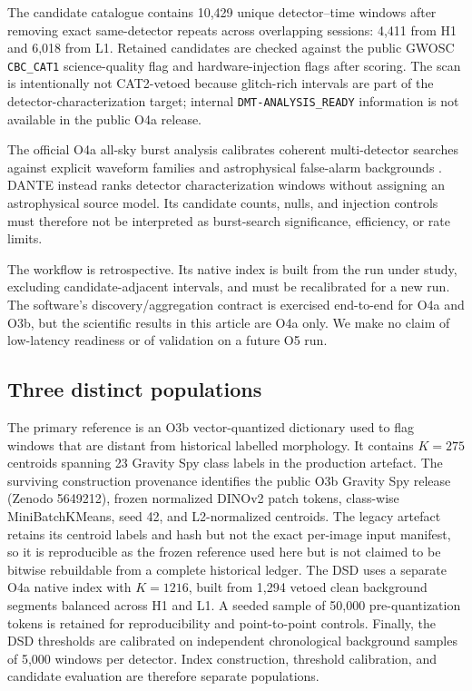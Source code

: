 \documentclass[12pt]{article}
\begin{document}
The candidate catalogue contains 10,429 unique detector--time windows after
removing exact same-detector repeats across overlapping sessions: 4,411 from
H1 and 6,018 from L1.  Retained candidates are checked against the public
GWOSC \texttt{CBC\_CAT1} science-quality flag and hardware-injection flags
after scoring.  The scan is intentionally not CAT2-vetoed because glitch-rich
intervals are part of the detector-characterization target; internal
\texttt{DMT-ANALYSIS\_READY} information is not available in the public O4a
release.

The official O4a all-sky burst analysis calibrates coherent multi-detector
searches against explicit waveform families and astrophysical false-alarm
backgrounds \cite{lvk_burst_o4a}.  DANTE instead ranks detector
characterization
windows without assigning an astrophysical source model.  Its candidate counts,
nulls, and injection controls must therefore not be interpreted as burst-search
significance, efficiency, or rate limits.

The workflow is retrospective.  Its native index is built from the run under
study, excluding candidate-adjacent intervals, and must be recalibrated for a
new run.  The software's discovery/aggregation contract is exercised
end-to-end for O4a and O3b, but the scientific results in this article are O4a
only.  We make no claim of low-latency readiness or of validation on a future
O5 run.

\subsection{Three distinct populations}

The primary reference is an O3b vector-quantized dictionary used to flag
windows that are distant from historical labelled morphology.  It contains
$K=275$ centroids spanning 23 Gravity Spy class labels in the production
artefact.  The surviving construction provenance identifies the public O3b
Gravity Spy release (Zenodo 5649212), frozen normalized DINOv2 patch tokens,
class-wise MiniBatchKMeans, seed 42, and L2-normalized centroids.  The legacy
artefact retains its centroid labels and hash but not the exact per-image input
manifest, so it is reproducible as the frozen reference used here but is not
claimed to be bitwise rebuildable from a complete historical ledger.  The DSD uses a separate O4a
native index with $K=1216$, built from 1,294 vetoed clean background segments
balanced across H1 and L1.  A seeded sample of 50,000 pre-quantization tokens
is retained for reproducibility and point-to-point controls.  Finally, the DSD
thresholds are calibrated on independent chronological background samples of
5,000 windows per detector.  Index construction, threshold calibration, and
candidate evaluation are therefore separate populations.
\end{document}
